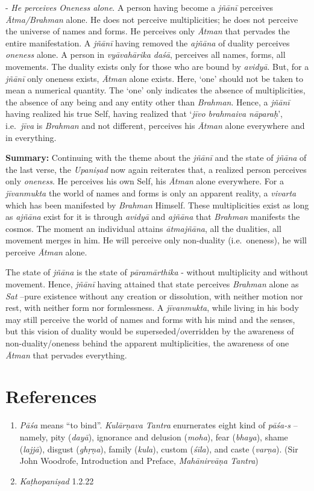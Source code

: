 - \emph{He perceives Oneness alone}. A person having become a \emph{jñānī} perceives \emph{Ātma/Brahman} alone. He does not perceive multiplicities; he does not perceive the universe of names and forms. He perceives only \emph{Ātman} that pervades the entire manifestation. A \emph{jñānī} having removed the \emph{ajñāna} of duality perceives \emph{oneness} alone. A person in \emph{vyāvahārika daśā}, perceives all names, forms, all movements. The duality exists only for those who are bound by \emph{avidyā}. But, for a \emph{jñānī} only oneness exists, \emph{Ātman} alone exists. Here, `one' should not be taken to mean a numerical quantity. The `one' only indicates the absence of multiplicities, the absence of any being and any entity other than \emph{Brahman}. Hence, a \emph{jñānī} having realized his true Self, having realized that `\emph{jīvo brahmaiva nāparaḥ}', i.e.\ \emph{jīva} is \emph{Brahman} and not different, perceives his \emph{Ātman} alone everywhere and in everything.

\textbf{Summary:} Continuing with the theme about the \emph{jñānī} and the state of \emph{jñāna} of the last verse, the \emph{Upaniṣad} now again reiterates that, a realized person perceives only \emph{oneness}. He perceives his own Self, his \emph{Ātman} alone everywhere. For a \emph{jīvanmukta} the world of names and forms is only an apparent reality, a \emph{vivarta} which has been manifested by \emph{Brahman} Himself. These multiplicities exist as long as \emph{ajñāna} exist for it is through \emph{avidyā} and \emph{ajñāna} that \emph{Brahman} manifests the cosmos. The moment an individual attains \emph{ātmajñāna}, all the dualities, all movement merges in him. He will perceive only non-duality (i.e.\ oneness), he will perceive \emph{Ātman} alone.

The state of \emph{jñāna} is the state of \emph{pāramārthika} - without multiplicity and without movement. Hence, \emph{jñānī} having attained that state perceives \emph{Brahman} alone as \emph{Sat} --pure existence without any creation or dissolution, with neither motion nor rest, with neither form nor formlessness. A \emph{jīvanmukta}, while living in his body may still perceive the world of names and forms with his mind and the senses, but this vision of duality would be superseded/overridden by the awareness of non-duality/oneness behind the apparent multiplicities, the awareness of one \emph{Ātman} that pervades everything.

\section*{References}

\begin{enumerate}
\itemsep=0pt
\item
  \emph{Pāśa} means ``to bind''. \emph{Kulārṇava Tantra} enurnerates eight kind of \emph{pāśa-s} -- namely, pity (\emph{dayā}), ignorance and delusion (\emph{moha}), fear (\emph{bhaya}), shame (\emph{lajjā}), disgust (\emph{ghṛṇa}), family (\emph{kula}), custom (\emph{śīla}), and caste (\emph{varṇa}). (Sir John Woodrofe, Introduction and Preface, \emph{Mahānirvāṇa Tantra})
\item
  \emph{Kaṭhopaniṣad} 1.2.22
\end{enumerate}
